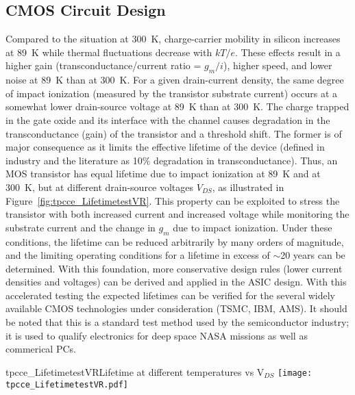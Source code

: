\subsection{CMOS Circuit Design}
\label{subsec:fe_CMOS}

Compared to the situation at 300~K, charge-carrier mobility in silicon increases at 89~K
while thermal fluctuations decrease with $kT/e$.
These effects result in a higher gain (transconductance/current ratio = $g_{m}/ i$), higher speed, and lower noise
at 89~K than at 300~K.
For a given drain-current density, the same degree of impact ionization (measured by the transistor substrate current)
occurs at a somewhat lower drain-source voltage at 89~K than at 300~K.
The charge trapped in the gate oxide and its interface with the channel causes degradation in the transconductance (gain)
of the transistor and a threshold shift.
The former is of major consequence as it limits the effective lifetime of the device
(defined in industry and the literature as 10\% degradation in transconductance).
Thus, an MOS transistor has equal lifetime due to impact ionization at 89~K and at 300~K,
but at different drain-source voltages $V_{DS}$,
as illustrated in Figure~\ref{fig:tpcce_LifetimetestVR}.  
This property can be exploited to stress the transistor with both increased current
and increased voltage while monitoring the substrate current and the change in $g_{m}$ due to impact ionization.
Under these conditions, the lifetime can be reduced arbitrarily by many orders of magnitude,
and the limiting operating conditions for a lifetime in excess of $\sim$20 years can be determined.
With this foundation, more conservative design rules (lower current densities and voltages)
can be derived and applied in the ASIC design.
With this accelerated testing the expected lifetimes can be verified for the several
widely available CMOS technologies under consideration (TSMC, IBM, AMS).
It should be noted that this is a standard test method used by the semiconductor industry;
it is used to qualify electronics for deep space NASA missions as well as commerical PCs.
 
\begin{cdrfigure}{tpcce_LifetimetestVR}{Lifetime at different temperatures vs V$_{DS}$}
\texttt{[image: tpcce\_LifetimetestVR.pdf]}
\end{cdrfigure}


